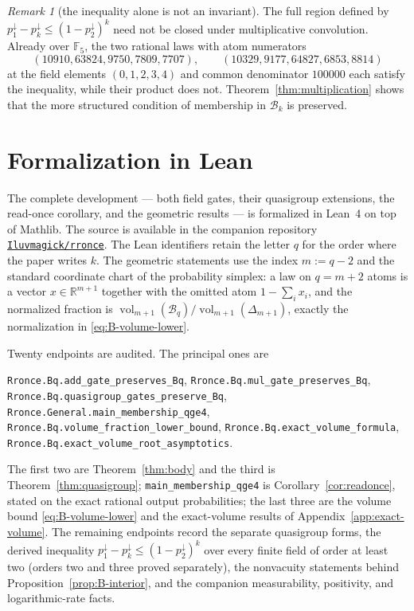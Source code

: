 \documentclass[11pt]{article}
\theoremstyle{definition}
\theoremstyle{remark}
\newtheorem{remark}[theorem]{Remark}
\newcommand{\F}{\mathbb{F}}
\newcommand{\R}{\mathbb{R}}
\newcommand{\body}{\mathcal{B}}
\newcommand{\down}{\downarrow}
\begin{document}
\begin{remark}[the inequality alone is not an invariant]
\label{rem:obstruction}
The full region defined by $p_1^\down-p_k^\down\le(1-p_2^\down)^k$ need
not be closed under multiplicative convolution.  Already over $\F_5$,
the two rational laws with atom numerators
\[
 (10910,63824,9750,7809,7707),\qquad
 (10329,9177,64827,6853,8814)
\]
at the field elements $(0,1,2,3,4)$ and common denominator $100000$
each satisfy the inequality, while their product does not.
Theorem~\ref{thm:multiplication} shows that the more structured
condition of membership in $\body_k$ is preserved.
\end{remark}


\clearpage
\appendix

\section{Formalization in Lean}\label{sec:lean}

The complete development --- both field gates, their quasigroup
extensions, the read-once corollary, and the geometric results --- is
formalized in Lean~4 on top of Mathlib.  The source is available in the
companion repository
\href{https://github.com/Iluvmagick/rronce}{\texttt{Iluvmagick/rronce}}.
The Lean identifiers retain the letter $q$ for the order where the paper
writes $k$.  The geometric statements use the index $m:=q-2$ and the
standard coordinate chart of the probability simplex: a law on $q=m+2$
atoms is a vector $x\in\R^{m+1}$ together with the omitted atom
$1-\sum_ix_i$, and the normalized fraction is
$\operatorname{vol}_{m+1}(\body_q)/\operatorname{vol}_{m+1}(\Delta_{m+1})$,
exactly the normalization in \eqref{eq:B-volume-lower}.

Twenty endpoints are audited.  The principal ones are
\begin{center}
\texttt{Rronce.Bq.add\_gate\_preserves\_Bq},\qquad
\texttt{Rronce.Bq.mul\_gate\_preserves\_Bq},\\
\texttt{Rronce.Bq.quasigroup\_gates\_preserve\_Bq},\qquad
\texttt{Rronce.General.main\_membership\_qge4},\\
\texttt{Rronce.Bq.volume\_fraction\_lower\_bound},\qquad
\texttt{Rronce.Bq.exact\_volume\_formula},\\
\texttt{Rronce.Bq.exact\_volume\_root\_asymptotics}.
\end{center}
The first two are Theorem~\ref{thm:body} and the third is
Theorem~\ref{thm:quasigroup}; \texttt{main\_membership\_qge4} is
Corollary~\ref{cor:readonce}, stated on the exact rational output
probabilities; the last three are the volume bound
\eqref{eq:B-volume-lower} and the exact-volume results of
Appendix~\ref{app:exact-volume}.  The remaining endpoints record the
separate quasigroup forms, the derived inequality
$p_1^\down-p_k^\down\le(1-p_2^\down)^k$ over every finite field of
order at least two (orders two and three proved separately), the
nonvacuity statements behind Proposition~\ref{prop:B-interior}, and the
companion measurability, positivity, and logarithmic-rate facts.
\end{document}
